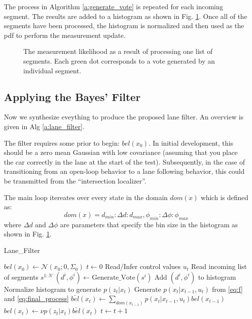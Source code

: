\documentclass[12pt]{article}
\begin{document}
The process in Algorithm \ref{a:generate_vote} is repeated for each incoming segment. The results are added to a histogram as shown in Fig. \ref{fig:measurement_likelihood}. Once all of the segments have been processed, the histogram is normalized and then used as the pdf to perform the measurement update.


\begin{figure}[htb]
\centering
\def\svgwidth{7cm}

\caption{The measurement likelihood as a result of processing one list of segments. Each green dot corresponds to a vote generated by an individual segment.}
\label{fig:measurement_likelihood}
\end{figure}


\subsection{Applying the Bayes' Filter}

Now we synthesize eveything to produce the proposed lane filter. An overview is given in Alg \ref{a:lane_filter}.

The filter requires some prior to begin: $bel(x_0)$. In initial development, this should be a zero mean Gaussian with low covariance (assuming that you place the car correctly in the lane at the start of the test). Subsequently, in the case of transitioning from an open-loop behavior to a lane following behavior, this could be transmitted from the ``intersection localizer''. 

The main loop itereates over every state in the domain $dom(x)$ which is defined as:
\begin{equation}
dom(x) = d_{min}:\Delta{d}:d_{max},\phi_{min}:\Delta{\phi}:\phi_{max}
\end{equation}
where $\Delta{d}$ and $\Delta{\phi}$ are parameters that specify the bin size in the histogram as shown in Fig. \ref{fig:measurement_likelihood}.

\begin{algorithm}[h!] %
\caption{Lane\_Filter}
\label{a:lane_filter}
\begin{algorithmic}[1]
\STATE $bel(x_0) \gets \mathcal{N}(x_0;0,\Sigma_0)$
\STATE $t\gets 0$
  \STATE Read/Infer control values $u_t$
  \STATE Read incoming list of segments $s^{1:N}$
    \STATE $(d^i,\phi^i) \gets \text{Generate\_Vote}(s^i)$
    \STATE Add $(d^i,\phi^i)$ to histogram
  \ENDFOR
  \STATE Normalize histogram to generate $p(z_t|x_t)$
    \STATE Generate $p(x_t|x_{t-1},u_t)$ from \eqref{eq:f} and \eqref{eq:final_process}
    \STATE $\bar{bel}(x_t) \gets \displaystyle\sum_{dom(x_{t-1})} p(x_t|x_{t-1},u_t)bel(x_{t-1})$
    \STATE $bel(x_t) \gets \nu p(z_t|x_t)\bar{bel}(x_t)$
  \ENDFOR
  \STATE $t \gets t+1$
\ENDWHILE
\end{algorithmic}
\end{algorithm}
\end{document}
